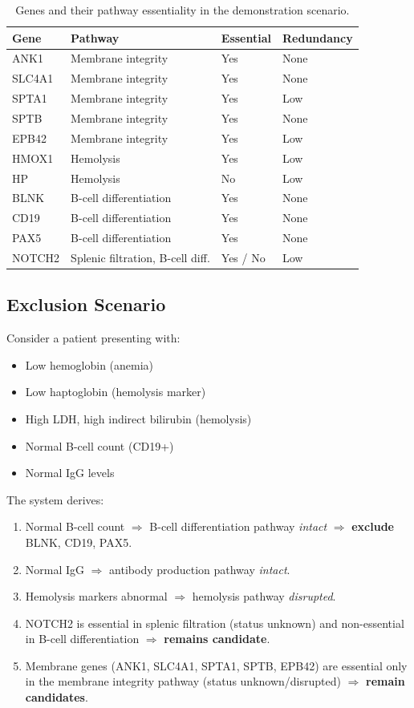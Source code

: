 \documentclass[12pt,a4paper]{article}
\begin{document}
\begin{table}[H]
\centering
\caption{Genes and their pathway essentiality in the demonstration scenario.}
\label{tab:genes}
\begin{tabular}{llll}
\toprule
\textbf{Gene} & \textbf{Pathway} & \textbf{Essential} & \textbf{Redundancy} \\
\midrule
ANK1 & Membrane integrity & Yes & None \\
SLC4A1 & Membrane integrity & Yes & None \\
SPTA1 & Membrane integrity & Yes & Low \\
SPTB & Membrane integrity & Yes & None \\
EPB42 & Membrane integrity & Yes & Low \\
HMOX1 & Hemolysis & Yes & Low \\
HP & Hemolysis & No & Low \\
BLNK & B-cell differentiation & Yes & None \\
CD19 & B-cell differentiation & Yes & None \\
PAX5 & B-cell differentiation & Yes & None \\
NOTCH2 & Splenic filtration, B-cell diff. & Yes / No & Low \\
\bottomrule
\end{tabular}
\end{table}

\subsection{Exclusion Scenario}

Consider a patient presenting with:
\begin{itemize}
    \item Low hemoglobin (anemia)
    \item Low haptoglobin (hemolysis marker)
    \item High LDH, high indirect bilirubin (hemolysis)
    \item Normal B-cell count (CD19+)
    \item Normal IgG levels
\end{itemize}

The system derives:
\begin{enumerate}
    \item Normal B-cell count $\Rightarrow$ B-cell differentiation pathway \emph{intact} $\Rightarrow$ \textbf{exclude} BLNK, CD19, PAX5.
    \item Normal IgG $\Rightarrow$ antibody production pathway \emph{intact}.
    \item Hemolysis markers abnormal $\Rightarrow$ hemolysis pathway \emph{disrupted}.
    \item NOTCH2 is essential in splenic filtration (status unknown) and non-essential in B-cell differentiation $\Rightarrow$ \textbf{remains candidate}.
    \item Membrane genes (ANK1, SLC4A1, SPTA1, SPTB, EPB42) are essential only in the membrane integrity pathway (status unknown/disrupted) $\Rightarrow$ \textbf{remain candidates}.
\end{enumerate}
\end{document}
